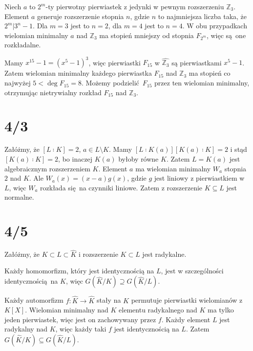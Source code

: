 \documentclass[a4paper, 12pt]{article}
\newcommand{\+}{\enspace}
\begin{document}
Niech $a$ to $2^m$-ty pierwotny pierwiastek z jedynki w pewnym
rozszerzeniu $ℤ_3$.
Element $a$ generuje rozszerzenie stopnia $n$, gdzie $n$ to najmniejsza
liczba taka, że $2^m | 3^n - 1$.
Dla $m=3$ jest to $n=2$, dla $m=4$ jest to $n=4$.
W obu przypadkach wielomian minimalny $a$ nad $ℤ_3$ ma stopień mniejszy
od stopnia $F_{2^m}$, więc są one rozkładalne.

Mamy $x^{15}-1 = (x^5-1)^3$, więc pierwiastki $F_{15}$ w $\hat{ℤ_3}$
są pierwiastkami $x^5-1$.
Zatem wielomian minimalny każdego pierwiastka $F_{15}$ nad $ℤ_3$
ma stopień co najwyżej $5 < \deg F_{15} = 8$.
Możemy podzielić $F_{15}$ przez ten wielomian minimalny, otrzymując
nietrywialny rozkład $F_{15}$ nad $ℤ_3$.



\section*{4/3}
Załóżmy, że $[L ∶ K] = 2$, $a ∈ L\setminus K$.
Mamy $[L ∶ K(a)][K(a) ∶ K] = 2$ i stąd $[K(a) ∶ K] = 2$,
bo inaczej $K(a)$ byłoby równe $K$.
Zatem $L = K(a)$ jest algebraicznym rozszerzeniem $K$.
Element $a$ ma wielomian minimalny $W_a$ stopnia $2$ nad $K$.
Ale $W_a(x) = (x-a)g(x)$, gdzie $g$ jest liniowy z pierwiastkiem w $L$,
więc $W_a$ rozkłada się na czynniki liniowe.
Zatem z rozszerzenie $K ⊆ L$ jest normalne.


\iffalse
\section*{4/4}
Załóżmy, że rozszerzenie $K⊂L$ jest algebraiczne i $f: L→L$ jest monomorfizmem,
$f|_K = id$.

Weźmy $α∈L$,
jest to pierwiastek pewnego wielomianu $W=∑_{i=0}^n k_iX^i$, gdzie $k_i ∈ K$.
Zatem
$$0=f(0)=f(W(α)) = f(∑_{i=0}^n k_iα^i) = ∑_{i=0}^n f(k_iα^i) = ∑_{i=0}^n k_if(α)^i = W(f(α)),$$
czyli $f(α)$ też jest pierwiastkiem tego wielomianu.
Takich pierwiastków jest skończenie wiele, a funkcja $f$ jest iniektywna,
więc je permutuje.
W szczególności $α$ jest wartością $f$ dla jakiegoś pierwiastka $W$.

Zatem monomorizm $f$ jest surjektywny.
\fi



\section*{4/5}
Załóżmy, że $K ⊂ L ⊂ \hat{K}$ i rozszerzenie $K ⊂ L$ jest radykalne.

Każdy homomorfizm, który jest identycznością na $L$, jest w szczególności
identycznością na $K$, więc $G(\hat{K}/K) ⊇ G(\hat{K}/L)$.

Każdy automorfizm $f: \hat{K} → \hat{K}$ stały na $K$ permutuje
pierwiastki wielomianów z $K[X]$.
Wielomian minimalny nad $K$ elementu radykalnego nad $K$
ma tylko jeden pierwiastek, więc jest on zachowywany przez $f$.
Każdy element $L$ jest radykalny nad $K$,
więc każdy taki $f$ jest identycznością na $L$.
Zatem $G(\hat{K}/K) ⊆ G(\hat{K}/L)$.
\end{document}
